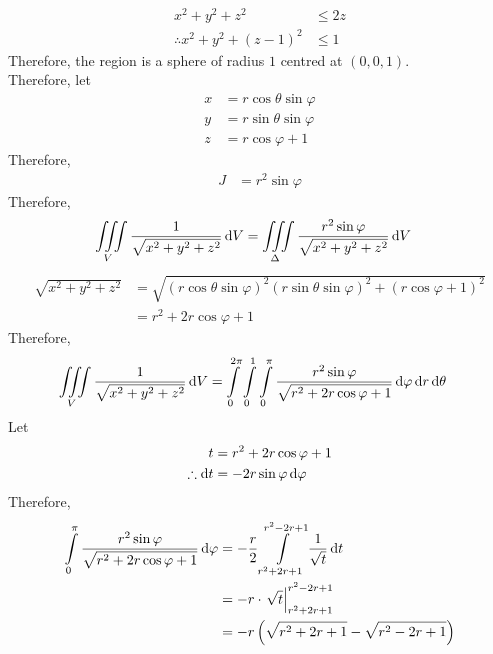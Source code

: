 \documentclass[fleqn, a4paper, 12pt, twoside]{article}
\theoremstyle{definition}
\theoremstyle{theorem}
\begin{document}
\begin{solution}
	\begin{align*}
		x^2 + y^2 + z^2 &\le 2 z\\
		\therefore x^2 + y^2 + (z - 1)^2 &\le 1
	\end{align*}
	Therefore, the region is a sphere of radius $1$ centred at $(0,0,1)$.\\
	Therefore, let
	\begin{align*}
		x & = r \cos \theta \sin \varphi \\
		y & = r \sin \theta \sin \varphi \\
		z & = r \cos \varphi + 1
	\end{align*}
	Therefore,
	\begin{align*}
		J & = r^2 \sin \varphi
	\end{align*}
	Therefore,
	\begin{align*}
		\iiint\limits_{V} \frac{1}{\sqrt{x^2 + y^2 + z^2}} \dif V &= \iiint\limits_{\Delta} \frac{r^2 \sin \varphi}{\sqrt{x^2 + y^2 + z^2}} \dif V
	\end{align*}
	\begin{align*}
		\sqrt{x^2 + y^2 + z^2} &= \sqrt{(r \cos \theta \sin \varphi)^2 (r \sin \theta \sin \varphi)^2 + (r \cos \varphi + 1)^2}\\
		&= r^2 + 2 r \cos \varphi + 1
	\end{align*}
	Therefore,
	\begin{align*}
		\iiint\limits_{V} \frac{1}{\sqrt{x^2 + y^2 + z^2}} \dif V &= \int\limits_{0}^{2 \pi} \int\limits_{0}^{1} \int\limits_{0}^{\pi} \frac{r^2 \sin \varphi}{\sqrt{r^2 + 2 r \cos \varphi + 1}} \dif \varphi \dif r \dif \theta
	\end{align*}
	Let
	\begin{align*}
		t &= r^2 + 2 r \cos \varphi + 1\\
		\therefore \dif t &= -2 r \sin \varphi \dif \varphi
	\end{align*}
	Therefore,
	\begin{align*}
		\int\limits_{0}^{\pi} \frac{r^2 \sin \varphi}{\sqrt{r^2 + 2 r \cos \varphi + 1}} \dif \varphi & = -\frac{r}{2} \int\limits_{r^2 + 2 r + 1}^{r^2 - 2 r + 1} \frac{1}{\sqrt{t}} \dif t \\
                                                                                                              & = -r \cdot \left. \sqrt{t} \right|_{r^2 + 2 r + 1}^{r^2 - 2 r + 1}                   \\
                                                                                                              & = -r \left( \sqrt{r^2 + 2 r + 1} - \sqrt{r^2 - 2 r + 1} \right)                      \\

\end{align*}
\end{solution}
\end{document}
